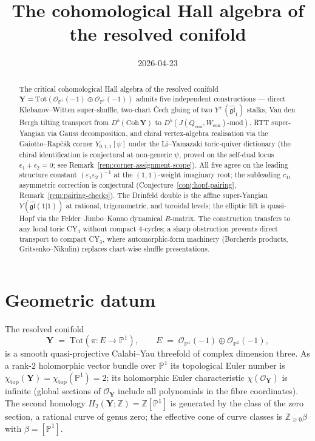 \documentclass[11pt]{amsart}
\title{The cohomological Hall algebra of the resolved conifold}
\author{}
\date{2026-04-23}
\theoremstyle{definition}
\providecommand{\bY}{\mathbf{Y}}
\providecommand{\cO}{\mathcal{O}}
\providecommand{\bZ}{\mathbb{Z}}
\providecommand{\bP}{\mathbb{P}}
\providecommand{\fgl}{\mathfrak{gl}}
\begin{document}
\maketitle

\begin{abstract}
\noindent The critical cohomological Hall algebra of the resolved conifold
$\bY = \mathrm{Tot}(\cO_{\bP^1}(-1) \oplus \cO_{\bP^1}(-1))$ admits five
independent constructions --- direct Klebanov--Witten super-shuffle, two-chart
\v{C}ech gluing of two $Y^+(\widehat{\fgl}_1)$ stalks, Van den Bergh tilting
transport from $D^b(\mathrm{Coh}\,\bY)$ to $D^b(J(Q_{\mathrm{con}},
W_{\mathrm{con}})\text{-mod})$, RTT super-Yangian via Gauss decomposition, and
chiral vertex-algebra realisation via the Gaiotto--Rap\v{c}\'ak corner
$Y_{0,1,1}[\psi]$ under the Li--Yamazaki toric-quiver dictionary (the chiral
identification is conjectural at non-generic $\psi$, proved on the self-dual
locus $\epsilon_1 + \epsilon_2 = 0$; see
Remark~\ref{rem:corner-assignment-scope}). All five agree on the leading
structure constant $(\varepsilon_1 \varepsilon_2)^{-1}$ at the $(1,1)$-weight
imaginary root; the subleading $c_{11}$ asymmetric correction is conjectural
(Conjecture~\ref{conj:hopf-pairing}, Remark~\ref{rem:pairing-checks}). The
Drinfeld double is the affine super-Yangian $Y(\widehat{\fgl}(1|1))$ at
rational, trigonometric, and toroidal levels; the elliptic lift is
quasi-Hopf via the Felder--Jimbo--Konno dynamical $R$-matrix. The
construction transfers to any local toric CY$_3$ without compact
$4$-cycles; a sharp obstruction prevents direct transport to compact CY$_3$,
where automorphic-form machinery (Borcherds products, Gritsenko--Nikulin)
replaces chart-wise shuffle presentations.
\end{abstract}

\tableofcontents

\section{Geometric datum}
\label{sec:geometric-datum}

The resolved conifold
\[
  \bY \;=\; \mathrm{Tot}(\pi\colon E \to \bP^1), \qquad
  E \;=\; \cO_{\bP^1}(-1) \oplus \cO_{\bP^1}(-1),
\]
is a smooth quasi-projective Calabi--Yau threefold of complex dimension three.
As a rank-$2$ holomorphic vector bundle over $\bP^1$ its topological Euler
number is $\chi_{\mathrm{top}}(\bY) = \chi_{\mathrm{top}}(\bP^1) = 2$; its
holomorphic Euler characteristic $\chi(\cO_{\bY})$ is infinite (global
sections of $\cO_{\bY}$ include all polynomials in the fibre coordinates).
The second homology $H_2(\bY; \bZ) = \bZ[\bP^1]$ is generated by the class of
the zero section, a rational curve of genus zero; the effective cone of curve
classes is $\bZ_{\geq 0}\beta$ with $\beta = [\bP^1]$.
\end{document}
